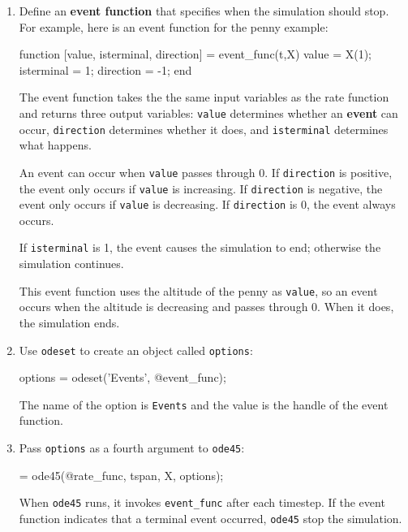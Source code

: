 \documentclass[
]{book}
\numberwithin{Answer}{chapter}
\numberwithin{Exercise}{chapter}
\begin{document}
\begin{enumerate}

\item Define an {\bf event function} that specifies when the simulation should stop.  For example,  here is an event function for the penny example:

\begin{code}
function [value, isterminal, direction] = event_func(t,X)
    value = X(1);
    isterminal = 1;
    direction = -1;
end
\end{code}

The event function takes the the same input variables as the rate function and returns three output variables: {\tt value} determines whether an {\bf event} can occur, {\tt direction} determines whether it does, and {\tt isterminal} determines what happens.

An event can occur when {\tt value} passes through 0.
If {\tt direction} is positive, the event only occurs if {\tt value} is increasing.
If {\tt direction} is negative, the event only occurs if {\tt value} is decreasing.
If {\tt direction} is 0, the event always occurs.

If {\tt isterminal} is 1, the event causes the simulation to end; otherwise the simulation continues.

This event function uses the altitude of the penny as {\tt value}, so an event occurs when the altitude is decreasing and passes through 0.  When it does, the simulation ends.


\item Use {\tt odeset} to create an object called {\tt options}:

\begin{code}
options = odeset('Events', @event_func);
\end{code}
%
The name of the option is {\tt Events} and the value is the handle of the event function.  

\item Pass {\tt options} as a fourth argument to {\tt ode45}:

\begin{code}
[T, M] = ode45(@rate_func, tspan, X, options);
\end{code}

When {\tt ode45} runs, it invokes \verb"event_func" after each timestep.  If the event function indicates that a terminal event occurred, 
{\tt ode45} stop the simulation.

\end{enumerate}
\end{document}
